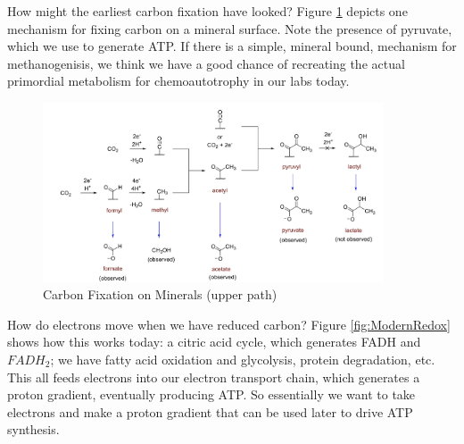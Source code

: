 \documentclass[]{article}
\begin{document}
How might the earliest carbon fixation have looked? Figure \ref{fig:CarbonFixationMinerals} \cite{varma2018native} depicts one mechanism for fixing carbon on a mineral surface. Note the presence of pyruvate, which we use to generate ATP. If there is a simple, mineral bound, mechanism for methanogenisis, we think we have a good chance of recreating the actual primordial metabolism for chemoautotrophy in our labs today.
  
\begin{figure}[H]
	\caption{Carbon Fixation on Minerals (upper path)} \label{fig:CarbonFixationMinerals} 
	\includegraphics[width=0.9\textwidth]{CarbonFixationMinerals}
\end{figure}

How do electrons move when we have reduced carbon? Figure \ref{fig:ModernRedox} shows how this works today: a citric acid cycle, which generates FADH and $FADH_2$; we have fatty acid oxidation and glycolysis, protein degradation, etc. This all feeds electrons into our electron transport chain, which generates a proton gradient, eventually producing ATP. So essentially we want to take electrons and make a proton gradient that can be used later to drive ATP synthesis.
\end{document}
